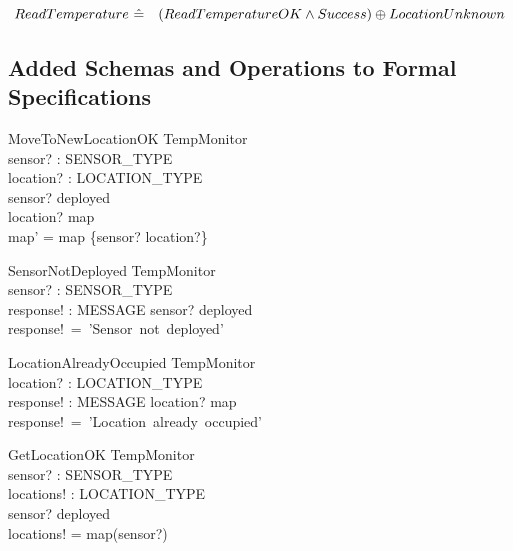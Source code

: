\documentclass[12pt]{article}
\begin{document}
		\[ ReadTemperature~\hat{=}~\\
		~~~(ReadTemperatureOK \wedge Success) \oplus LocationUnknown \]
		
		\subsection{Added Schemas and Operations to Formal Specifications}

        \begin{schema}{MoveToNewLocationOK}
            \Delta TempMonitor\\
            sensor? : SENSOR\_TYPE\\
            location? : LOCATION\_TYPE\\
            \where
            sensor? \in deployed\\
            location? \notin \ran map\\
            map' = map \oplus \{sensor? \mapsto location?\} 
        \end{schema}
        
        \begin{schema}{SensorNotDeployed}
			\Xi TempMonitor\\
			sensor? : SENSOR\_TYPE\\
			response! : MESSAGE
			\where
			sensor? \notin deployed\\
			response!~=~'Sensor~not~deployed'\\
		\end{schema}
        
        \begin{schema}{LocationAlreadyOccupied}
			\Xi TempMonitor\\
			location? : LOCATION\_TYPE\\
			response! : MESSAGE
			\where
			location? \in \ran map\\
			response!~=~'Location~already~occupied'
		\end{schema}
		
		\begin{schema}{GetLocationOK}
            \Xi TempMonitor\\
            sensor? : SENSOR\_TYPE\\
            locations! : LOCATION\_TYPE\\
            \where
            sensor? \in deployed\\
            locations! = map(sensor?)
        \end{schema}
\end{document}
